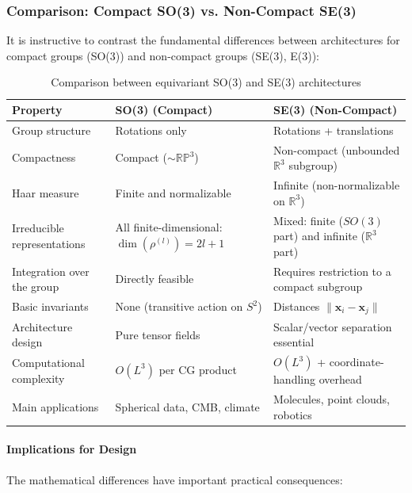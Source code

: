\subsubsection{Comparison: Compact SO(3) vs. Non-Compact SE(3)}\label{subsubsec:so3_vs_se3_comparison}

It is instructive to contrast the fundamental differences between architectures for compact groups (SO(3)) and non-compact groups (SE(3), E(3)):

\begin{table}[h]
\centering
\begin{tabular}{|l|p{5cm}|p{5cm}|}
\hline
\textbf{Property} & \textbf{SO(3) (Compact)} & \textbf{SE(3) (Non-Compact)} \\
\hline
Group structure & Rotations only & Rotations + translations \\
\hline
Compactness & Compact ($\sim \mathbb{RP}^3$) & Non-compact (unbounded $\mathbb{R}^3$ subgroup) \\
\hline
Haar measure & Finite and normalizable & Infinite (non-normalizable on $\mathbb{R}^3$) \\
\hline
Irreducible representations & All finite-dimensional: $\dim(\rho^{(l)}) = 2l+1$ & Mixed: finite ($SO(3)$ part) and infinite ($\mathbb{R}^3$ part) \\
\hline
Integration over the group & Directly feasible & Requires restriction to a compact subgroup \\
\hline
Basic invariants & None (transitive action on $S^2$) & Distances $\|\mathbf{x}_i - \mathbf{x}_j\|$ \\
\hline
Architecture design & Pure tensor fields & Scalar/vector separation essential \\
\hline
Computational complexity & $O(L^3)$ per CG product & $O(L^3)$ + coordinate-handling overhead \\
\hline
Main applications & Spherical data, CMB, climate & Molecules, point clouds, robotics \\
\hline
\end{tabular}
\caption{Comparison between equivariant SO(3) and SE(3) architectures}
\label{tab:so3_vs_se3}
\end{table}

\paragraph{Implications for Design}

The mathematical differences have important practical consequences:

